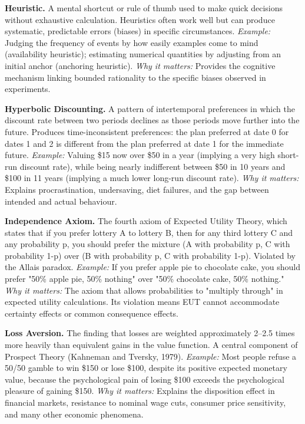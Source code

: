\documentclass[12pt, letterpaper]{article}
\begin{document}
\textbf{Heuristic.} A mental shortcut or rule of thumb used to make quick decisions without exhaustive calculation. Heuristics often work well but can produce systematic, predictable errors (biases) in specific circumstances. \textit{Example:} Judging the frequency of events by how easily examples come to mind (availability heuristic); estimating numerical quantities by adjusting from an initial anchor (anchoring heuristic). \textit{Why it matters:} Provides the cognitive mechanism linking bounded rationality to the specific biases observed in experiments.

\textbf{Hyperbolic Discounting.} A pattern of intertemporal preferences in which the discount rate between two periods declines as those periods move further into the future. Produces time-inconsistent preferences: the plan preferred at date 0 for dates 1 and 2 is different from the plan preferred at date 1 for the immediate future. \textit{Example:} Valuing \$15 now over \$50 in a year (implying a very high short-run discount rate), while being nearly indifferent between \$50 in 10 years and \$100 in 11 years (implying a much lower long-run discount rate). \textit{Why it matters:} Explains procrastination, undersaving, diet failures, and the gap between intended and actual behaviour.

\textbf{Independence Axiom.} The fourth axiom of Expected Utility Theory, which states that if you prefer lottery A to lottery B, then for any third lottery C and any probability p, you should prefer the mixture (A with probability p, C with probability 1-p) over (B with probability p, C with probability 1-p). Violated by the Allais paradox. \textit{Example:} If you prefer apple pie to chocolate cake, you should prefer "50\% apple pie, 50\% nothing" over "50\% chocolate cake, 50\% nothing." \textit{Why it matters:} The axiom that allows probabilities to "multiply through" in expected utility calculations. Its violation means EUT cannot accommodate certainty effects or common consequence effects.

\textbf{Loss Aversion.} The finding that losses are weighted approximately 2--2.5 times more heavily than equivalent gains in the value function. A central component of Prospect Theory (Kahneman and Tversky, 1979). \textit{Example:} Most people refuse a 50/50 gamble to win \$150 or lose \$100, despite its positive expected monetary value, because the psychological pain of losing \$100 exceeds the psychological pleasure of gaining \$150. \textit{Why it matters:} Explains the disposition effect in financial markets, resistance to nominal wage cuts, consumer price sensitivity, and many other economic phenomena.
\end{document}
